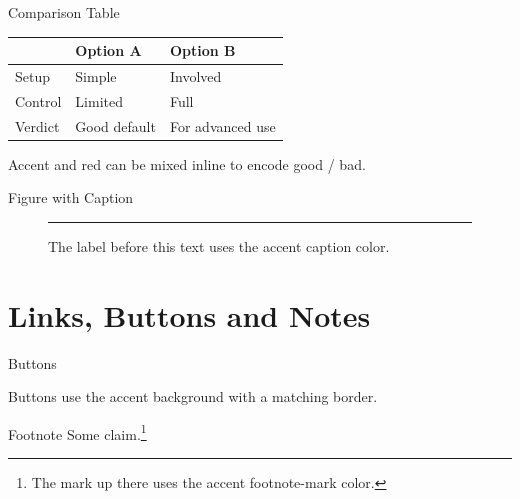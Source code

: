 \documentclass[aspectratio=169]{beamer}
\begin{document}
\begin{frame}{Comparison Table}
    \small
    \begin{tabularx}{\textwidth}{@{} l >{\centering\arraybackslash}X
                                        >{\centering\arraybackslash}X @{}}
        \toprule
                  & \textbf{Option A} & \textbf{Option B} \\
        \midrule
        Setup     & \textcolor{UUlmInstitute}{Simple}
                  & \textcolor{UUlmRed}{Involved} \\[3pt]
        Control   & \textcolor{UUlmRed}{Limited}
                  & \textcolor{UUlmInstitute}{Full} \\[3pt]
        Verdict   & Good default
                  & For advanced use \\
        \bottomrule
    \end{tabularx}

    \vspace{2em}
    {\small\color{UUlmMutedBlack}%
        Accent and red can be mixed inline to encode good / bad.%
    }
\end{frame}

\begin{frame}{Figure with Caption}
  \begin{figure}
    \rule{3cm}{2cm}              %
    \caption{The label before this text uses the accent caption color.}
  \end{figure}
\end{frame}

\section{Links, Buttons and Notes}

\begin{frame}{Buttons}\label{buttons}
  \hfill
  \hyperlink{buttons}{} %

  \vspace{1em}
  Buttons use the accent background with a matching border.
\end{frame}

\begin{frame}{Footnote}
  Some claim.\footnote{The mark up there uses the accent footnote-mark color.}
\end{frame}
\end{document}
